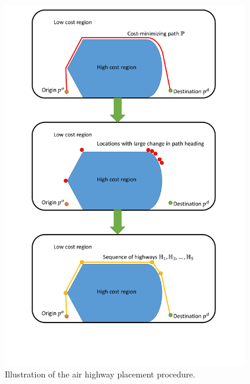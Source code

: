 \begin{figure}
	\centering
	\includegraphics[width=0.95\textwidth]{"fig/highway_illustration"}
	\caption{Illustration of the air highway placement procedure.}
	\label{fig:hw_ill}
\end{figure}